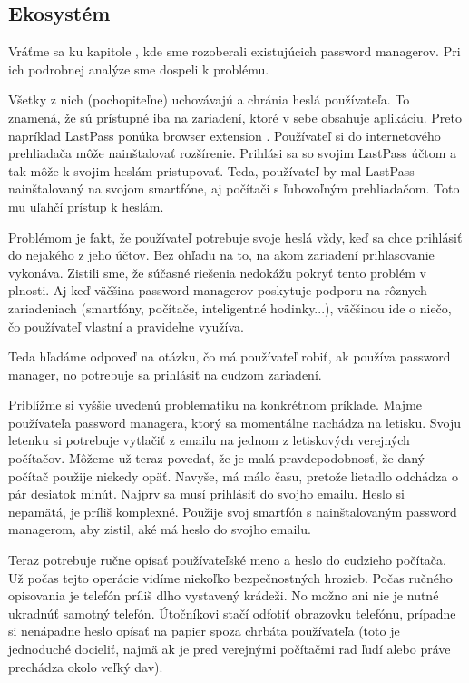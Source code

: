\subsection{Ekosystém}
Vráťme sa ku kapitole , kde sme rozoberali existujúcich password managerov. Pri ich podrobnej analýze sme dospeli k problému. 

Všetky z nich (pochopiteľne) uchovávajú a chránia heslá používateľa. To znamená, že sú prístupné iba na zariadení, ktoré v sebe obsahuje aplikáciu. Preto napríklad LastPass ponúka browser extension \cite{how_lastpass_works}. Používateľ si do internetového prehliadača môže nainštalovať rozšírenie. Prihlási sa so svojim LastPass účtom a tak môže k svojim heslám pristupovať. Teda, používateľ by mal LastPass nainštalovaný na svojom smartfóne, aj počítači s ľubovoľným prehliadačom. Toto mu uľahčí prístup k heslám.

Problémom je fakt, že používateľ potrebuje svoje heslá vždy, keď sa chce prihlásiť do nejakého z jeho účtov. Bez ohľadu na to, na akom zariadení prihlasovanie vykonáva. Zistili sme, že súčasné riešenia nedokážu pokryť tento problém v plnosti. Aj keď väčšina password managerov poskytuje podporu na rôznych zariadeniach (smartfóny, počítače, inteligentné hodinky...), väčšinou ide o niečo, čo používateľ vlastní a pravidelne využíva. 

Teda hľadáme odpoveď na otázku, čo má používateľ robiť, ak používa password manager, no potrebuje sa prihlásiť na cudzom zariadení. 

Priblížme si vyššie uvedenú problematiku na konkrétnom príklade. Majme používateľa password managera, ktorý sa momentálne nachádza na letisku. Svoju letenku si potrebuje vytlačiť z emailu na jednom z letiskových verejných počítačov. Môžeme už teraz povedať, že je malá pravdepodobnosť, že daný počítač použije niekedy opäť. Navyše, má málo času, pretože lietadlo odchádza o pár desiatok minút. Najprv sa musí prihlásiť do svojho emailu. Heslo si nepamätá, je príliš komplexné. Použije svoj smartfón s nainštalovaným password managerom, aby zistil, aké má heslo do svojho emailu. 

Teraz potrebuje ručne opísať používateľské meno a heslo do cudzieho počítača. Už počas tejto operácie vidíme niekoľko bezpečnostných hrozieb. Počas ručného opisovania je telefón príliš dlho vystavený krádeži. No možno ani nie je nutné ukradnúť samotný telefón. Útočníkovi stačí odfotiť obrazovku telefónu, prípadne si nenápadne heslo opísať na papier spoza chrbáta používateľa (toto je jednoduché docieliť, najmä ak je pred verejnými počítačmi rad ľudí alebo práve prechádza okolo veľký dav). 

